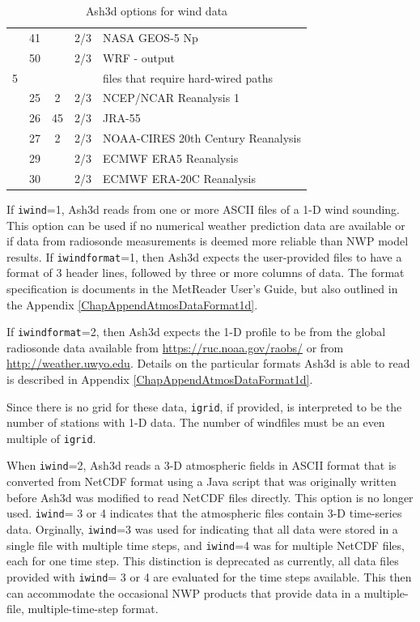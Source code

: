 \begin{table}[htbp]
\begin{center}
\begin{tabular}{| c | c| c | c | l |}
 &41&   &2/3&NASA GEOS-5 Np\\
 &50&   &2/3&WRF - output\\
\hline
5& & & &files that require hard-wired paths \\
\hline
 &25&  2&2/3&NCEP/NCAR Reanalysis 1\\
 &26& 45&2/3&JRA-55\\
 &27&  2&2/3&NOAA-CIRES 20th Century Reanalysis\\
 &29&   &2/3&ECMWF ERA5 Reanalysis\\
 &30&   &2/3&ECMWF ERA-20C Reanalysis\\
\hline
\end{tabular}
\caption{\label{tab:MetOptions}Ash3d options for wind data}
\end{center}
\end{table}
\normalsize

If \texttt{iwind}=1, Ash3d reads from one or more ASCII files of a 1-D wind sounding.
This option can be used if no numerical weather prediction
data are available or if data from radiosonde measurements is deemed more
reliable than NWP model results.
If \texttt{iwindformat}=1, then Ash3d expects the user-provided files to have a format
of 3 header lines, followed by three or more columns of data. The format specification
is documents in the MetReader User's Guide, but also outlined in the
Appendix \ref{ChapAppendAtmosDataFormat1d}.

If \texttt{iwindformat}=2, then Ash3d expects the 1-D profile to be from the global
radiosonde data available from \url{https://ruc.noaa.gov/raobs/} or from
\url{http://weather.uwyo.edu}. Details on the particular formats Ash3d is able to
read is described in Appendix \ref{ChapAppendAtmosDataFormat1d}.

Since there is no grid for these data, \texttt{igrid}, if provided, is interpreted to
be the number of stations with 1-D data. The number of windfiles must be an even
multiple of \texttt{igrid}.

When \texttt{iwind}=2, Ash3d reads a 3-D atmospheric fields in ASCII format that is converted from
NetCDF format using a Java script that was originally written before Ash3d was
modified to read NetCDF files directly. This option is no longer used.
\texttt{iwind}= 3 or 4 indicates that the atmospheric files contain 3-D time-series
data. Orginally, \texttt{iwind}=3 was used for indicating that all data were stored in
a single file with multiple time steps, and \texttt{iwind}=4 was for multiple NetCDF files,
each for one time step. This distinction is deprecated as currently, all data
files provided with \texttt{iwind}= 3 or 4 are evaluated for the time steps available.
This then can accommodate the occasional NWP products that provide data in a
multiple-file, multiple-time-step format.

